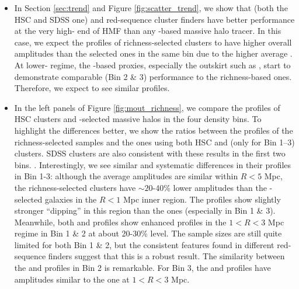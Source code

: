 \documentclass[a4paper,fleqn,usenatbib]{mnras}
\begin{document}
    \begin{itemize}

        \item In Section \ref{sec:trend} and Figure \ref{fig:scatter_trend}, we show that
            \redm{} (both the HSC and SDSS one) and \camira{} red-sequence cluster finders 
            have better performance at the very high-\mvir{} end of HMF than any \mstar{}-based
            massive halo tracer.
            In this case, we expect the \dsigma{} profiles of richness-selected clusters to 
            have higher overall amplitudes than the \mstar{} selected ones in the same bin 
            due to the higher average \mvir{}.
            At lower-\mvir{} regime, the \mstar{}-based \mvir{} proxies, especially the outskirt
            \mstar{} such as , start to demonstrate comparable (Bin 2 \& 3) 
            \sigmh{} performance to the richness-based ones. 
            Therefore, we expect to see similar \dsigma{} profiles.
        
        \item In the left panels of Figure \ref{fig:mout_richness}, we compare the \dsigma{}
            profiles of HSC \redm{} clusters and -selected massive halos in the four
            density bins.
            To highlight the differences better, we show the ratios between the \dsigma{} profiles 
            of the richness-selected samples and the  ones using both 
            HSC \redm{} and \camira{} (only for Bin 1--3) clusters.
            SDSS \redm{} clusters are also consistent with these results in the first two bins.
            .
            Interestingly, we see similar and systematic differences in their \dsigma{} 
            profiles in Bin 1-3: although the average amplitudes are similar within 
            $R < 5$ Mpc, the richness-selected clusters have $\sim 20$-40\% lower \dsigma{} amplitudes than 
            the -selected galaxies in the $R < 1$ Mpc inner region.
            The \camira{} \dsigma{} profiles show slightly stronger ``dipping'' in this region 
            than the \redm{} ones (especially in Bin 1 \& 3).
            Meanwhile, both \redm{} and \camira{} profiles show enhanced \dsigma{} profiles in the 
            $1 < R < 3$ Mpc regime in Bin 1 \& 2 at about 20-30\% level.
            The sample sizes are still quite limited for both Bin 1 \& 2, but the consistent features 
            found in different red-sequence finders suggest that this is a robust result.
            The similarity between the \redm{} and \camira{} profiles in Bin 2 is remarkable.
            For Bin 3, the \redm{} and \camira{} \dsigma{} profiles have amplitudes similar 
            to the \menve{} one at $1 < R < 3$ Mpc.
        

\end{itemize}
\end{document}
